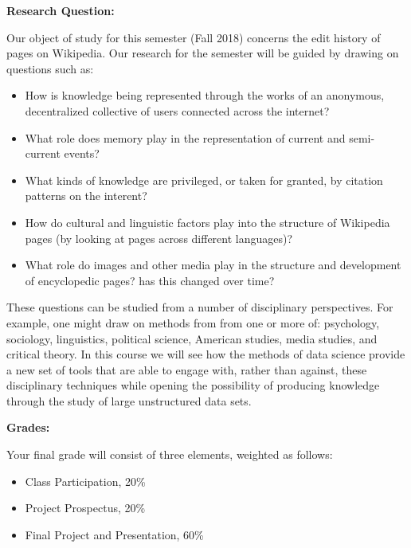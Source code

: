 \documentclass[12pt]{article}
\begin{document}
\textbf{Research Question:} \vspace{6pt}

Our object of study for this semester (Fall 2018) concerns the edit history
of pages on Wikipedia. Our research for the semester will be guided by drawing
on questions such as:

\begin{itemize}\setlength\itemsep{0em}
\item How is knowledge being represented through the works of an anonymous,
decentralized collective of users connected across the internet?
\item What role does memory play in the representation of current and
semi-current events?
\item What kinds of knowledge are privileged, or taken for granted, by
citation patterns on the interent?
\item How do cultural and linguistic factors play into the structure of
Wikipedia pages (by looking at pages across different languages)?
\item What role do images and other media play in the structure and
development of encyclopedic pages? has this changed over time?
\end{itemize}

These questions can be studied from a number of disciplinary perspectives.
For example, one might draw on methods from from one or more of: psychology,
sociology, linguistics, political science, American studies, media studies,
and critical theory. In this course we will see how the methods of data
science provide a new set of tools that are able to engage with, rather than
against, these disciplinary techniques while opening the possibility of
producing knowledge through the study of large unstructured data sets.

\clearpage

\textbf{Grades:} \vspace{6pt}

Your final grade will consist of three elements, weighted as follows:

\begin{itemize}[noitemsep,topsep=6pt]
\item Class Participation, 20\%
\item Project Prospectus, 20\%
\item Final Project and Presentation, 60\%
\end{itemize}

\vspace{3pt}
\end{document}
